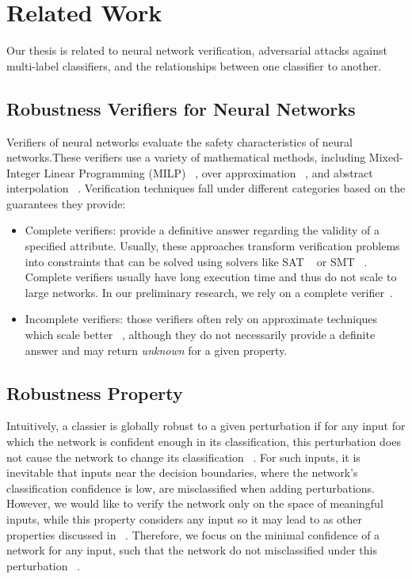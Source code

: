 
\section{Related Work}
Our thesis is related to neural network verification, adversarial attacks against multi-label classifiers, and the relationships between one classifier to another.

\subsection{Robustness Verifiers for Neural Networks}\label{subsec:verifiers}
Verifiers of neural networks evaluate the safety characteristics of neural networks.These verifiers use a variety of mathematical methods, including Mixed-Integer Linear Programming (MILP) ~\cite{singh2018robustness,lazarus2022mixed}, over approximation ~\cite{qin2019verification}, and abstract interpolation ~\cite{ABSTRACTINTER,INCOMPLETE1}. Verification techniques fall under different categories based on the guarantees they provide:
\begin{itemize}
    \item  Complete verifiers: provide a definitive answer regarding the validity of a specified attribute. Usually, these approaches transform verification problems into constraints that can be solved using solvers like SAT ~\cite{SATAPPROACH1,SATAPPROACH2} or SMT ~\cite{NNTOBINARCONSTRAINS,PLANET,Reluplex}. Complete verifiers usually have long execution time and thus do not scale to large networks.
        In our preliminary research, we rely on a complete verifier~\cite{MIPVERIFY}.
    \item Incomplete verifiers: those verifiers often rely on approximate techniques which scale better ~\cite{INCOMPLETE1,INCOMPLETE2}, although they do not necessarily provide a definite answer and may return \emph{unknown} for a given property. 
\end{itemize}

\subsection{Robustness Property}
Intuitively, a classier is globally robust to a given perturbation if for any input for which the network is confident enough in its classification, this perturbation does not cause the network to change its classification ~\cite{GLOBALROBUSNN}. For such inputs, it is inevitable that inputs near the decision boundaries, where the network’s classification confidence is low, are misclassified when adding perturbations. However, we would like to verify the network only on the space of meaningful inputs, while this property considers any input so it may lead to as other properties discussed in ~\cite{Reluplex,EFCIENTGLOBALROBU}. Therefore, we focus on the minimal confidence of a network for any input, such that the network do not misclassified under this perturbation ~\cite{VHAGAR}.
     

